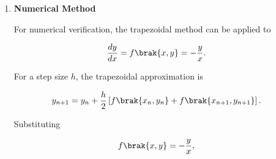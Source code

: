 \begin{enumerate}[label=\thesubsection.\arabic*, ref=\thesubsection.\theenumi,itemsep=0pt]
\begin{enumerate}[label=\theenumii, ref=\theenumii, itemsep=0pt]
\begin{align}
\frac{dy}{dx}
&=-\frac{y}{x}.
\end{align}

Separating the variables,

\begin{align}
\frac{1}{y}\,dy
&=-\frac{1}{x}\,dx.
\end{align}

Integrating both sides,

\begin{align}
\int\frac{1}{y}\,dy
&=-\int\frac{1}{x}\,dx.
\end{align}

Therefore,

\begin{align}
\ln|y|
&=-\ln|x|+C.
\end{align}

Hence,

\begin{align}
\ln|xy|
&=C,
\end{align}

which gives

\begin{align}
y&=\frac{C}{x}.
\end{align}

For $C=0$,

\begin{align}
y&=0.
\end{align}

Thus, both

\[
y=\frac{C}{x}
\qquad\text{and}\qquad
y=0
\]

are valid solutions.

\item \textbf{Numerical Method}

For numerical verification, the trapezoidal method can be applied to

\begin{align}
\frac{dy}{dx}
&=f\brak{x,y}=-\frac{y}{x}.
\end{align}

For a step size $h$, the trapezoidal approximation is

\begin{align}
y_{n+1}
&=y_n+\frac{h}{2}
\left[
f\brak{x_n,y_n}+f\brak{x_{n+1},y_{n+1}}
\right].
\end{align}

Substituting

\begin{align}
f\brak{x,y}
&=-\frac{y}{x},
\end{align}


\end{enumerate}
\end{enumerate}
